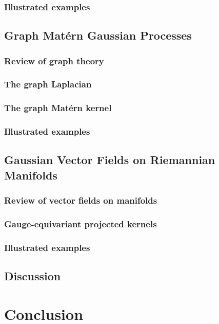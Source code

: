 \documentclass[11pt]{book}
\begin{document}
\subsection{Illustrated examples}

\section{Graph Matérn Gaussian Processes}

\subsection{Review of graph theory}
\subsection{The graph Laplacian}
\subsection{The graph Matérn kernel}
\subsection{Illustrated examples}

\section{Gaussian Vector Fields on Riemannian Manifolds}

\subsection{Review of vector fields on manifolds}
\subsection{Gauge-equivariant projected kernels}
\subsection{Illustrated examples}

\section{Discussion}
\label{sec:noneuclidean-discussion}





\chapter{Conclusion}
\label{ch:conclusion}

\printbibliography
\end{document}
